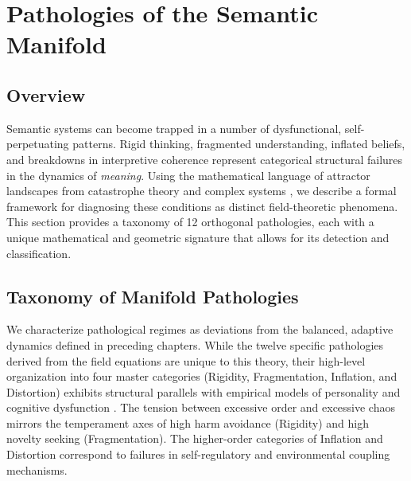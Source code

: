 \chapter{Pathologies of the Semantic Manifold}
\label{16:pathologies_of_the_semantic_manifold}


\section{Overview}
\label{16.1:overview}

Semantic systems can become trapped in a number of dysfunctional, self-perpetuating patterns. Rigid thinking, fragmented understanding, inflated beliefs, and breakdowns in interpretive coherence represent categorical structural failures in the dynamics of \textit{meaning}. Using the mathematical language of attractor landscapes from catastrophe theory and complex systems \autocite{Thom1975, Zeeman1977, Milnor1985}, we describe a formal framework for diagnosing these conditions as distinct field-theoretic phenomena. This section provides a taxonomy of 12 orthogonal pathologies, each with a unique mathematical and geometric signature that allows for its detection and classification.


\section{Taxonomy of Manifold Pathologies}
\label{16.2:taxonomy_of_manifold_pathologies}

We characterize pathological regimes as deviations from the balanced, adaptive dynamics defined in preceding chapters. While the twelve specific pathologies derived from the field equations are unique to this theory, their high-level organization into four master categories (Rigidity, Fragmentation, Inflation, and Distortion) exhibits structural parallels with empirical models of personality and cognitive dysfunction \autocite{Cloninger1993}. The tension between excessive order and excessive chaos mirrors the temperament axes of high harm avoidance (Rigidity) and high novelty seeking (Fragmentation). The higher-order categories of Inflation and Distortion correspond to failures in self-regulatory and environmental coupling mechanisms. 

